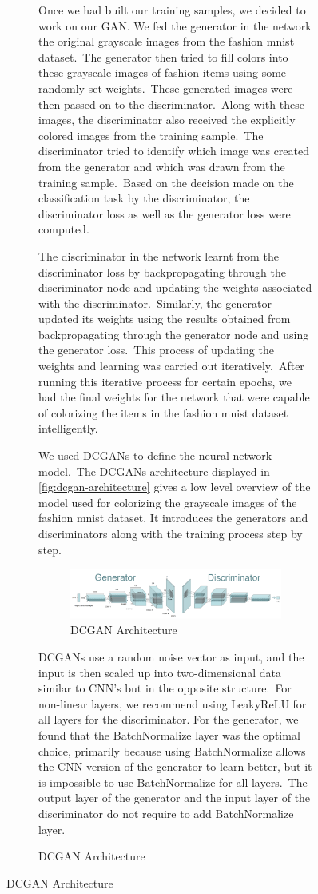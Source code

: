 \documentclass[conference]{IEEEtran}
\begin{document}
\begin{figure}[!h]
\begin{figure}[!h]
    Once we had built our training samples, we decided to work on our GAN. We fed the generator in the network the original grayscale images from the fashion mnist dataset.\ The generator then tried to fill colors into these grayscale images of fashion items using some randomly set weights.\ These generated images were then passed on to the discriminator.\ Along with these images, the discriminator also received the explicitly colored images from the training sample.\ The discriminator tried to identify which image was created from the generator and which was drawn from the training sample.\ Based on the decision made on the classification task by the discriminator, the discriminator loss as well as the generator loss were computed.

    The discriminator in the network learnt from the discriminator loss by backpropagating through the discriminator node and updating the weights associated with the discriminator.\ Similarly, the generator updated its weights using the results obtained from backpropagating through the generator node and using the generator loss.\ This process of updating the weights and learning was carried out iteratively.\ After running this iterative process for certain epochs, we had the final weights for the network that were capable of colorizing the items in the fashion mnist dataset intelligently.
    
    We used DCGANs to define the neural network model.\ The DCGANs architecture displayed in \autoref{fig:dcgan-architecture} gives a low level overview of the model used for colorizing the grayscale images of the fashion mnist dataset. It introduces the generators and discriminators along with the training process step by step.

    \begin{figure}
        \caption{DCGAN Architecture}
        \label{fig:dcgan-architecture}
        \includegraphics[width=9cm]{architecture.png}
        \centering
    \end{figure}

     DCGANs use a random noise vector as input, and the input is then scaled up into two-dimensional data similar to CNN's but in the opposite structure.\ For non-linear layers, we recommend using LeakyReLU for all layers for the discriminator. For the generator, we found that the BatchNormalize layer was the optimal choice, primarily because using BatchNormalize allows the CNN version of the generator to learn better, but it is impossible to use BatchNormalize for all layers.\ The output layer of the generator and the input layer of the discriminator do not require to add BatchNormalize layer.\ 


\end{figure}
\end{figure}
\end{document}
